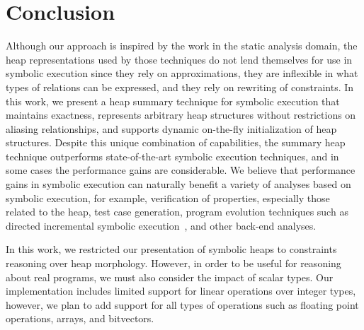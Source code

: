 \section{Conclusion}


Although our approach is inspired by the work in the static analysis domain, the heap representations used by those techniques do not lend themselves for use in symbolic execution since they rely on approximations, they are inflexible in what types of relations can be expressed, and they rely on rewriting of constraints.  In this work, we present a heap summary technique for symbolic execution that maintains exactness, represents arbitrary heap structures without restrictions on aliasing relationships, and supports dynamic on-the-fly initialization of heap structures. Despite this unique combination of capabilities, the summary heap technique outperforms  state-of-the-art symbolic execution techniques, and in some cases the performance gains are considerable. We believe that performance gains in symbolic execution can naturally benefit a variety of analyses based on symbolic execution, for example, verification of properties, especially those related to the heap, test case generation, program evolution techniques such as directed incremental symbolic execution~\cite{person:pldi2011}, and other back-end analyses.

In this work, we restricted our presentation of symbolic heaps to constraints reasoning over heap morphology. However, in order to be useful for reasoning about real programs, we must also consider the impact of scalar types. Our implementation includes limited support for linear operations over integer types, however, we plan to add support for all types of operations such as floating point operations, arrays, and bitvectors.


